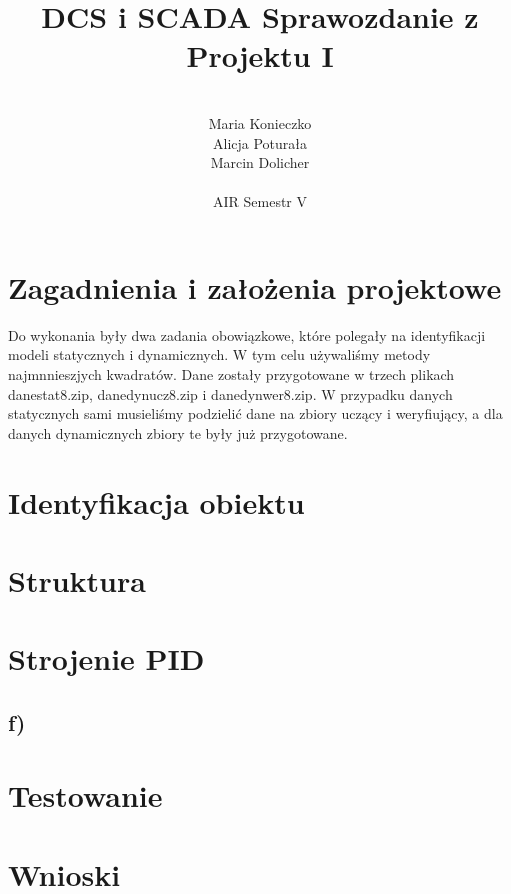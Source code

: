 \documentclass[12pt, a4paper]{article}
\author{
	\\ Maria Konieczko
	\\ Alicja Poturała
	\\ Marcin Dolicher
	\\
	\\ AIR Semestr V
}
\title{
    \quad \quad DCS i SCADA
	\newline
	Sprawozdanie z Projektu I		
}
\date{}
\begin{document}
\maketitle
\newpage
\tableofcontents

\newpage
\section{Zagadnienia i założenia projektowe}
Do wykonania były dwa zadania obowiązkowe, które polegały na identyfikacji modeli statycznych i dynamicznych. W tym celu używaliśmy metody najmnnieszjych kwadratów. Dane zostały przygotowane w trzech plikach danestat8.zip, danedynucz8.zip i danedynwer8.zip. W przypadku danych statycznych sami musieliśmy podzielić dane na zbiory uczący i weryfiujący, a dla danych dynamicznych zbiory te były już przygotowane.

\section{Identyfikacja obiektu}

\section{Struktura}

\section{Strojenie PID}

\subsection{f) }
\begin{figure}[h!]
\end{figure}

\section{Testowanie}

\section{Wnioski}
\end{document}
